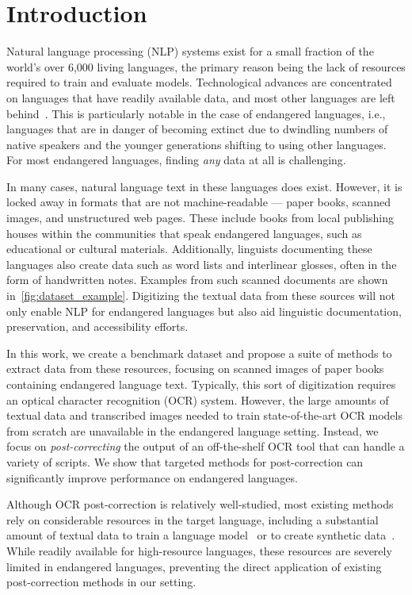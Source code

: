 \section{Introduction}

Natural language processing (NLP) systems exist for a small fraction of the world's over 6,000 living languages, the primary reason being the lack of resources required to train and evaluate models. Technological advances are concentrated on languages that have readily available data, and most other languages are left behind~\cite{joshi2020state}. This is particularly notable in the case of endangered languages, i.e., languages that are in danger of becoming extinct due to dwindling numbers of native speakers and the younger generations shifting to using other languages. For most endangered languages, finding \emph{any} data at all is challenging.

In many cases, natural language text in these languages does exist. However, it is locked away in formats that are not machine-readable --- paper books, scanned images, and unstructured web pages. These include books from local publishing houses within the communities that speak endangered languages, such as educational or cultural materials. Additionally, linguists documenting these languages also create data such as word lists and interlinear glosses, often in the form of handwritten notes. Examples from such scanned documents are shown in~\autoref{fig:dataset_example}. Digitizing the textual data from these sources will not only enable NLP for endangered languages but also aid linguistic documentation, preservation, and accessibility efforts.

In this work, we create a benchmark dataset and propose a suite of methods to extract data from these resources, focusing on scanned images of paper books containing endangered language text. Typically, this sort of digitization requires an optical character recognition (OCR) system. However, the large amounts of textual data and transcribed images needed to train state-of-the-art OCR models from scratch are unavailable in the endangered language setting. Instead, we focus on \emph{post-correcting} the output of an off-the-shelf OCR tool that can handle a variety of scripts. We show that targeted methods for post-correction can significantly improve performance on endangered languages.

Although OCR post-correction is relatively well-studied, most existing methods rely on considerable resources in the target language, including a substantial amount of textual data to train a language model~\cite{schnober-etal-2016-still,dong-smith-2018-multi,8978127} or to create synthetic data~\cite{krishna-etal-2018-upcycle}. While readily available for high-resource languages, these resources are severely limited in endangered languages, preventing the direct application of existing post-correction methods in our setting. 

